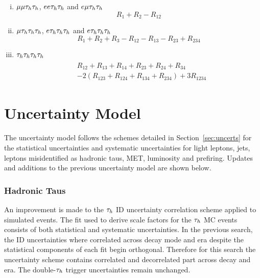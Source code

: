 \begin{enumerate}[i)]
\item $\mu\mu\tau_{h}\tau_{h}$, $ee\tau_{h}\tau_{h}$ and $e\mu\tau_{h}\tau_{h}$
\begin{equation}
R_1 + R_2 - R_{12}
\end{equation}

\item $\mu\tau_{h}\tau_{h}\tau_{h}$, $e\tau_{h}\tau_{h}\tau_{h}$ and $e\tau_{h}\tau_{h}\tau_{h}$
\begin{equation}
R_1 + R_2 + R_3 - R_{12} - R_{13} - R_{23} + R_{234}
\end{equation}

\item $\tau_{h}\tau_{h}\tau_{h}\tau_{h}$
\begin{align}
\begin{split}
&R_{12} + R_{13} + R_{14} + R_{23} + R_{24} + R_{34} \\
&- 2(R_{123} + R_{124} + R_{134} + R_{234}) + 3R_{1234}
\end{split}
\end{align}
\end{enumerate}
 
\section{Uncertainty Model}

The uncertainty model follows the schemes detailed in Section~\ref{sec:uncerts} for the statistical uncertainties and systematic uncertainties for light leptons, jets, leptons misidentified as hadronic taus, MET, luminosity and prefiring.
Updates and additions to the previous uncertainty model are shown below. \\

\subsubsection{Hadronic Taus}
An improvement is made to the $\tau_{h}$ ID uncertainty correlation scheme applied to simulated events.
The fit used to derive scale factors for the $\tau_{h}$ MC events consists of both statistical and systematic uncertainties.
In the previous search, the ID uncertainties where correlated across decay mode and era despite the statistical components of each fit begin orthogonal.
Therefore for this search the uncertainty scheme contains correlated and decorrelated part across decay and era.
The double-$\tau_{h}$ trigger uncertainties remain unchanged. \\

